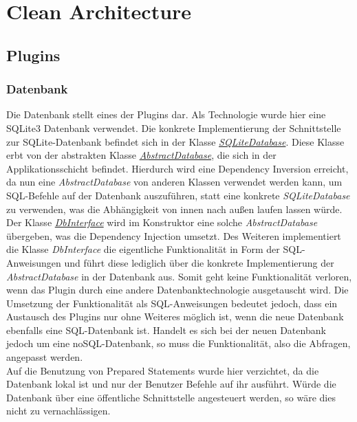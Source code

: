 \chapter{Clean Architecture}
\section{Plugins}
\subsection{Datenbank}
Die Datenbank stellt eines der Plugins dar. Als Technologie wurde hier eine SQLite3 Datenbank verwendet. Die konkrete Implementierung der Schnittstelle zur SQLite-Datenbank befindet sich in der Klasse \href{https://github.com/moorts/Morik/blob/main/src/plugins/database/SQLiteDatabase.h}{\textit{SQLiteDatabase}}. Diese Klasse erbt von der abstrakten Klasse \href{https://github.com/moorts/Morik/blob/main/src/application/AbstractDatabase.h}{\textit{AbstractDatabase}}, die sich in der Applikationsschicht befindet. Hierdurch wird eine Dependency Inversion erreicht, da nun eine \textit{AbstractDatabase} von anderen Klassen verwendet werden kann, um SQL-Befehle auf der Datenbank auszuführen, statt eine konkrete \textit{SQLiteDatabase} zu verwenden, was die Abhängigkeit von innen nach außen laufen lassen würde. Der Klasse \href{https://github.com/moorts/Morik/blob/main/src/application/DbInterface.h}{\textit{DbInterface}} wird im Konstruktor eine solche \textit{AbstractDatabase} übergeben, was die Dependency Injection umsetzt. Des Weiteren implementiert die Klasse \textit{DbInterface} die eigentliche Funktionalität in Form der SQL-Anweisungen und führt diese lediglich über die konkrete Implementierung der \textit{AbstractDatabase} in der Datenbank aus. Somit geht keine Funktionalität verloren, wenn das Plugin durch eine andere Datenbanktechnologie ausgetauscht wird. Die Umsetzung der Funktionalität als SQL-Anweisungen bedeutet jedoch, dass ein Austausch des Plugins nur ohne Weiteres möglich ist, wenn die neue Datenbank ebenfalls eine SQL-Datenbank ist. Handelt es sich bei der neuen Datenbank jedoch um eine noSQL-Datenbank, so muss die Funktionalität, also die Abfragen, angepasst werden.\\
Auf die Benutzung von Prepared Statements wurde hier verzichtet, da die Datenbank lokal ist und nur der Benutzer Befehle auf ihr ausführt. Würde die Datenbank über eine öffentliche Schnittstelle angesteuert werden, so wäre dies nicht zu vernachlässigen.
